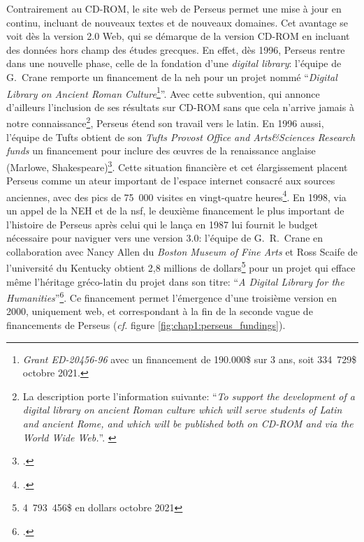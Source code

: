 Contrairement au CD-ROM, le site web de Perseus permet une mise à jour en continu, incluant de nouveaux textes et de nouveaux domaines. Cet avantage se voit dès la version 2.0 Web, qui se démarque de la version CD-ROM en incluant des données hors champ des études grecques. En effet, dès 1996, Perseus rentre dans une nouvelle phase, celle de la fondation d'une \textit{digital library}: l'équipe de G.~Crane remporte un financement de la \acrshort{neh} pour un projet nommé \enquote{\textit{Digital Library on Ancient Roman Culture}\footnote{\textit{Grant ED-20456-96} avec un financement de 190.000\$ sur 3 ans, soit 334~729\$ octobre 2021.}}. Avec cette subvention, qui annonce d'ailleurs l'inclusion de ses résultats sur CD-ROM sans que cela n'arrive jamais à notre connaissance\footnote{La description porte l'information suivante: \enquote{\textit{To support the development of a digital library on ancient Roman culture which will serve students of Latin and ancient Rome, and which will be published both on CD-ROM and via the World Wide Web.}}. \cite{noauthor_neh_nodate}}, Perseus étend son travail vers le latin. En 1996 aussi, l'équipe de Tufts obtient de son \textit{Tufts Provost Office and Arts\&Sciences Research funds} un financement pour inclure des œuvres de la renaissance anglaise (Marlowe, Shakespeare)\footcite{crane_perseus_1998}. Cette situation financière et cet élargissement placent Perseus comme un ateur important de l'espace internet consacré aux sources anciennes, avec des pics de 75~000 visites en vingt-quatre heures\footcite{crane_digital_1998}. En 1998, via un appel de la NEH et de la \acrfull{nsf}, le deuxième financement le plus important de l'histoire de Perseus après celui qui le lança en 1987 lui fournit le budget nécessaire pour naviguer vers une version 3.0: l'équipe de G.~R.~Crane en collaboration avec Nancy Allen du \textit{Boston Museum of Fine Arts} et Ross Scaife de l'université du Kentucky obtient 2,8 millions de dollars\footnote{4~793~456\$ en dollars octobre 2021} pour un projet qui efface même l'héritage gréco-latin du projet dans son titre: \enquote{\textit{A Digital Library for the Humanities}}\footcite{crane_digital_1998}. Ce financement permet l'émergence d'une troisième version en 2000, uniquement web, et correspondant à la fin de la seconde vague de financements de Perseus (\textit{cf.} figure \ref{fig:chap1:perseus_fundings}).

